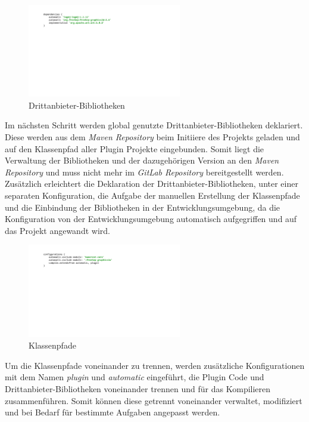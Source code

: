 	\begin{figure}[h!]
	  \centering
	  \includegraphics[width=0.6\textwidth]{material/images/gradle/dependencies.pdf}
	  \caption{Drittanbieter-Bibliotheken}
	  \label{fig:deps}
	\end{figure}

 	Im nächsten Schritt werden global genutzte Drittanbieter-Bibliotheken deklariert. Diese werden aus dem \textit{Maven Repository} beim Initiiere des Projekts geladen und auf den Klassenpfad aller Plugin Projekte eingebunden. Somit liegt die Verwaltung der Bibliotheken und der dazugehörigen Version an den \textit{Maven Repository} und muss nicht mehr im \textit{GitLab Repository} bereitgestellt werden.\newline
 	Zusätzlich erleichtert die Deklaration der Drittanbieter-Bibliotheken, unter einer separaten Konfiguration, die Aufgabe der manuellen Erstellung der Klassenpfade und die Einbindung der Bibliotheken in der Entwicklungsumgebung, da die Konfiguration von der Entwicklungsumgebung automatisch aufgegriffen und auf das Projekt angewandt wird.\bigbreak

	\begin{figure}[h!]
	  \centering
	  \includegraphics[width=0.6\textwidth]{material/images/gradle/configurations.pdf}
	  \caption{Klassenpfade}
	  \label{fig:kPath}
	\end{figure}

 	Um die Klassenpfade voneinander zu trennen, werden zusätzliche Konfigurationen mit dem Namen \textit{plugin} und \textit{automatic} eingeführt, die Plugin Code und Drittanbieter-Bibliotheken voneinander trennen und für das Kompilieren zusammenführen. Somit können diese getrennt voneinander verwaltet, modifiziert und bei Bedarf für bestimmte Aufgaben angepasst werden.\bigbreak

